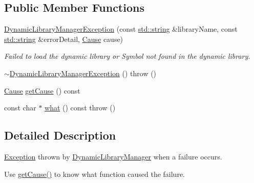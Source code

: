 \subsection*{Public Member Functions}
\begin{DoxyCompactItemize}
\item 
\hyperlink{class_dynamic_library_manager_exception_a15629092a054849f1cb73f8f468f8125}{Dynamic\-Library\-Manager\-Exception} (const \hyperlink{glew_8h_ae84541b4f3d8e1ea24ec0f466a8c568b}{std\-::string} \&library\-Name, const \hyperlink{glew_8h_ae84541b4f3d8e1ea24ec0f466a8c568b}{std\-::string} \&error\-Detail, \hyperlink{class_dynamic_library_manager_exception_a73b4694c152e0693fbc19fb04987a0b9}{Cause} cause)
\begin{DoxyCompactList}\small\item\em Failed to load the dynamic library or Symbol not found in the dynamic library. \end{DoxyCompactList}\item 
\hyperlink{class_dynamic_library_manager_exception_a874464a12028fa518bed09a11e2446ea}{$\sim$\-Dynamic\-Library\-Manager\-Exception} ()  throw ()
\item 
\hyperlink{class_dynamic_library_manager_exception_a73b4694c152e0693fbc19fb04987a0b9}{Cause} \hyperlink{class_dynamic_library_manager_exception_ab389b721f9a45814b8269ba865a1f25f}{get\-Cause} () const 
\item 
const char $\ast$ \hyperlink{class_dynamic_library_manager_exception_a3e6ed8a5e743a8ac80e4cb73a5d87360}{what} () const   throw ()
\end{DoxyCompactItemize}


\subsection{Detailed Description}
\hyperlink{class_exception}{Exception} thrown by \hyperlink{class_dynamic_library_manager}{Dynamic\-Library\-Manager} when a failure occurs. 

Use \hyperlink{class_dynamic_library_manager_exception_ab389b721f9a45814b8269ba865a1f25f}{get\-Cause()} to know what function caused the failure. 

